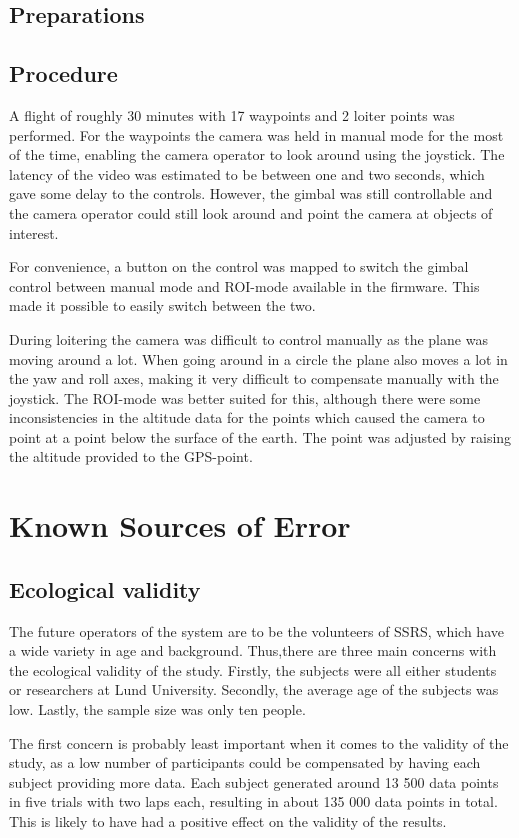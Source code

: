 \documentclass[nofilelist]{cslthse-msc}
\begin{document}
\subsection{Preparations}

\subsection{Procedure}
A flight of roughly 30 minutes with 17 waypoints and 2 loiter points was performed. For the waypoints the camera was held in manual mode for the most of the time, enabling the camera operator to look around using the joystick. The latency of the video was estimated to be between one and two seconds, which gave some delay to the controls. However, the gimbal was still controllable and the camera operator could still look around and point the camera at objects of interest.

For convenience, a button on the control was mapped to switch the gimbal control between manual mode and ROI-mode available in the firmware. This made it possible to easily switch between the two.

During loitering the camera was difficult to control manually as the plane was moving around a lot. When going around in a circle the plane also moves a lot in the yaw and roll axes, making it very difficult to compensate manually with the joystick. The ROI-mode was better suited for this, although there were some inconsistencies in the altitude data for the points which caused the camera to point at a point below the surface of the earth. The point was adjusted by raising the altitude provided to the GPS-point. 

\section{Known Sources of Error}

\subsection{Ecological validity}
The future operators of the system are to be the volunteers of SSRS, which have a wide variety in age and background. Thus,there are three main concerns with the ecological validity of the study. Firstly, the subjects were all either students or researchers at Lund University. Secondly, the average age of the subjects was low. Lastly, the sample size was only ten people. 

The first concern is probably least important when it comes to the validity of the study, as a low number of participants could be compensated by having each subject providing more data. Each subject generated around 13 500 data points in five trials with two laps each, resulting in about 135 000 data points in total. This is likely to have had a positive effect on the validity of the results.
\end{document}
